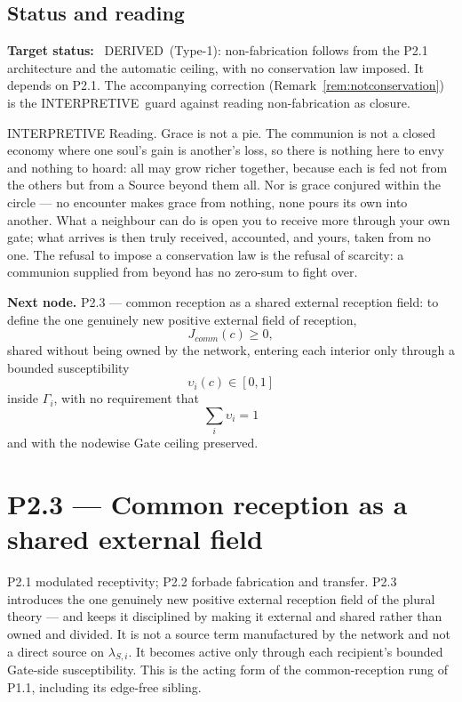 \documentclass[11pt,a4paper]{article}
\def\mathfrak#1{#1}%
\def\mathrm#1{#1}%
\def\emph#1{#1}%
\newcommand{\stDerived}{\textcolor{cDer}{\textsf{\small DERIVED}}}
\newcommand{\stInterp}{\textcolor{cInt}{\textsf{\small INTERPRETIVE}}}
\theoremstyle{definition}
\theoremstyle{plain}
\theoremstyle{remark}
\begin{document}
\subsection{Status and reading}

\textbf{Target status:}~
\stDerived\ (Type-1): non-fabrication follows from the P2.1 architecture and the automatic
ceiling, with no conservation law imposed. It depends on P2.1. The accompanying correction
(Remark~\ref{rem:notconservation}) is the \stInterp\ guard against reading non-fabrication
as closure.

\medskip
\stInterp\quad
\emph{Reading.}
Grace is not a pie. The communion is not a closed economy where one soul's gain is
another's loss, so there is nothing here to envy and nothing to hoard: all may grow richer
together, because each is fed not from the others but from a Source beyond them all. Nor is
grace conjured within the circle --- no encounter makes grace from nothing, none pours its
own into another. What a neighbour can do is open you to receive more through your own gate;
what arrives is then truly received, accounted, and yours, taken from no one. The refusal to
impose a conservation law is the refusal of scarcity: a communion supplied from beyond has
no zero-sum to fight over.

\medskip
\textbf{Next node.} P2.3 --- common reception as a shared external reception field:
to define the one genuinely new positive external field of reception,
\[
J_{\mathrm{comm}}(\mathfrak c)\ge0,
\]
shared without being owned by the network, entering each interior only through a
bounded susceptibility
\[
\upsilon_i(\mathfrak c)\in[0,1]
\]
inside \(\Gamma_i\), with no requirement that
\[
\sum_i\upsilon_i=1
\]
and with the nodewise Gate ceiling preserved.

\section{P2.3 --- Common reception as a shared external field}

P2.1 modulated receptivity; P2.2 forbade fabrication and transfer. P2.3 introduces
the one genuinely new positive \emph{external reception field} of the plural
theory --- and keeps it disciplined by making it external and shared rather than
owned and divided. It is not a source term manufactured by the network and not a
direct source on \(\lambda_{S,i}\). It becomes active only through each recipient's
bounded Gate-side susceptibility. This is the acting form of the common-reception
rung of P1.1, including its edge-free sibling.
\end{document}
